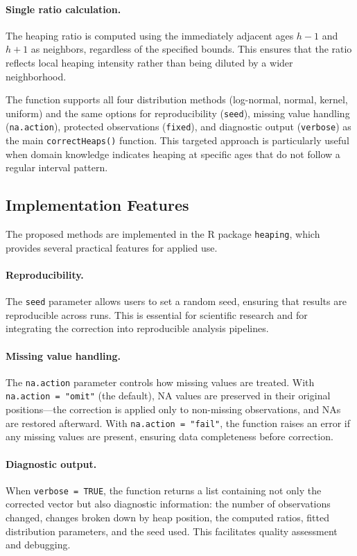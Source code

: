 \documentclass[12pt]{article}
\theoremstyle{plain}
\theoremstyle{definition}
\begin{document}
\paragraph{Single ratio calculation.} The heaping ratio is computed using the immediately adjacent ages $h-1$ and $h+1$ as neighbors, regardless of the specified bounds. This ensures that the ratio reflects local heaping intensity rather than being diluted by a wider neighborhood.

The function supports all four distribution methods (log-normal, normal, kernel, uniform) and the same options for reproducibility (\texttt{seed}), missing value handling (\texttt{na.action}), protected observations (\texttt{fixed}), and diagnostic output (\texttt{verbose}) as the main \texttt{correctHeaps()} function. This targeted approach is particularly useful when domain knowledge indicates heaping at specific ages that do not follow a regular interval pattern.

\subsection{Implementation Features}

The proposed methods are implemented in the R package \texttt{heaping}, which provides several practical features for applied use.

\paragraph{Reproducibility.} The \texttt{seed} parameter allows users to set a random seed, ensuring that results are reproducible across runs. This is essential for scientific research and for integrating the correction into reproducible analysis pipelines.

\paragraph{Missing value handling.} The \texttt{na.action} parameter controls how missing values are treated. With \texttt{na.action = "omit"} (the default), NA values are preserved in their original positions---the correction is applied only to non-missing observations, and NAs are restored afterward. With \texttt{na.action = "fail"}, the function raises an error if any missing values are present, ensuring data completeness before correction.

\paragraph{Diagnostic output.} When \texttt{verbose = TRUE}, the function returns a list containing not only the corrected vector but also diagnostic information: the number of observations changed, changes broken down by heap position, the computed ratios, fitted distribution parameters, and the seed used. This facilitates quality assessment and debugging.
\end{document}
